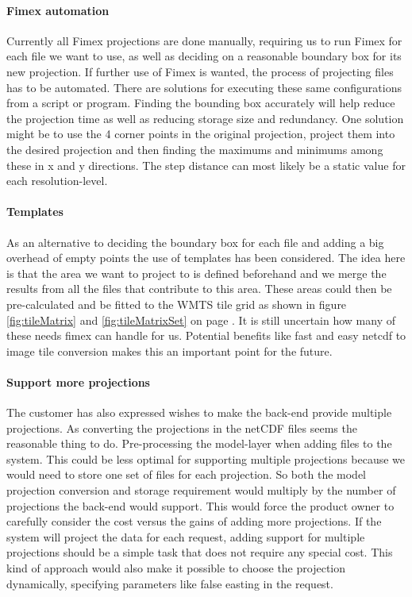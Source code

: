 \documentclass[11pt,a4paper,titlepage,oneside]{report}
\begin{document}
\paragraph{Fimex automation}
Currently all \gls{Fimex} projections are done manually, requiring us to run \gls{Fimex} for each file we want to use, as well as deciding on a reasonable boundary box for its new projection. If further use of \gls{Fimex} is wanted, the process of projecting files has to be automated. There are solutions for executing these same configurations from a script or program. Finding the bounding box accurately will help reduce the projection time as well as reducing storage size and redundancy. One solution might be to use the 4 corner points in the original projection, project them into the desired projection and then finding the maximums and minimums among these in x and y directions. The step distance can most likely be a static value for each resolution-level.

\paragraph{Templates}
As an alternative to deciding the boundary box for each file and adding a big overhead of empty points the use of templates has been considered. The idea here is that the area we want to project to is defined beforehand and we merge the results from all the files that contribute to this area. These areas could then be pre-calculated and be fitted to the \gls{WMTS} tile grid as shown in figure \ref{fig:tileMatrix} and \ref{fig:tileMatrixSet} on page \pageref{fig:tileMatrixSet}. It is still uncertain how many of these needs fimex can handle for us. Potential benefits like fast and easy \gls{netcdf} to image tile conversion makes this an important point for the future.

\paragraph{Support more projections}
The customer has also expressed wishes to make the back-end provide multiple projections. As converting the projections in the netCDF files seems the reasonable thing to do. Pre-processing the model-layer when adding files to the system. This could be less optimal for supporting multiple projections because we would need to store one set of files for each projection. So both the model projection conversion and storage requirement would multiply by the number of projections the \gls{back-end} would support. This would force the product owner to carefully consider the cost versus the gains of adding more projections. 
If the system will project the data for each request, adding support for multiple projections should be a simple task that does not require any special cost. This kind of approach would also make it possible to choose the projection dynamically, specifying parameters like false easting in the request.
\end{document}
